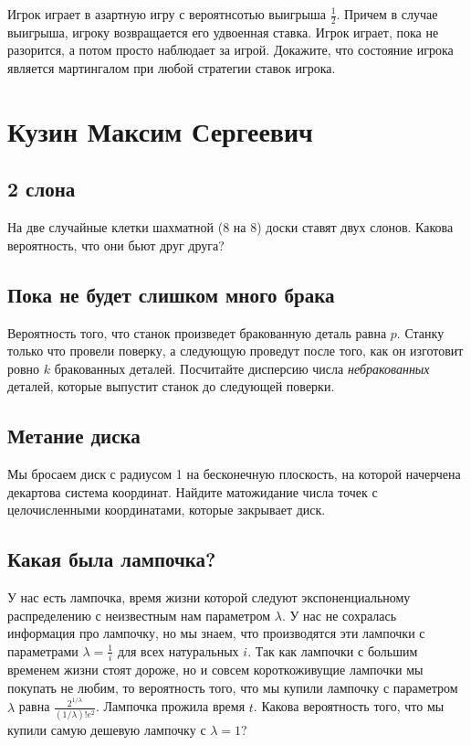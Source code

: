 \documentclass[12pt]{article}
\begin{document}
Игрок играет в азартную игру с вероятнсотью выигрыша $\frac{1}{2}$. Причем в случае выигрыша, игроку возвращается его удвоенная ставка. Игрок играет, пока не разорится, а потом просто наблюдает за игрой. Докажите, что состояние игрока является мартингалом при любой стратегии ставок игрока.



\newpage
\section{Кузин Максим Сергеевич}

\subsection{2 слона}

На две случайные клетки шахматной (8 на 8) доски ставят двух слонов. Какова вероятность, что они бьют друг друга?



\subsection{Пока не будет слишком много брака}

Вероятность того, что станок произведет бракованную деталь равна $p$. Станку только что провели поверку, а следующую проведут после того, как он изготовит ровно $k$ бракованных деталей. Посчитайте дисперсию числа \emph{небракованных} деталей, которые выпустит станок до следующей поверки.



\subsection{Метание диска}

Мы бросаем диск с радиусом 1 на бесконечную плоскость, на которой начерчена декартова система координат. Найдите матожидание числа точек с целочисленными координатами, которые закрывает диск.



\subsection{Какая была лампочка?}

У нас есть лампочка, время жизни которой следуют экспоненциальному распределению с неизвестным нам параметром $\lambda$. У нас не сохралась информация про лампочку, но мы знаем, что производятся эти лампочки с параметрами $\lambda = \frac{1}{i}$ для всех натуральных $i$. Так как лампочки с большим временем жизни стоят дороже, но и совсем короткоживущие лампочки мы покупать не любим, то вероятность того, что мы купили лампочку с параметром $\lambda$ равна $\frac{2^{1/\lambda}}{(1/\lambda)!e^2}$. Лампочка прожила время $t$. Какова вероятность того, что мы купили самую дешевую лампочку с $\lambda = 1$?
\end{document}
